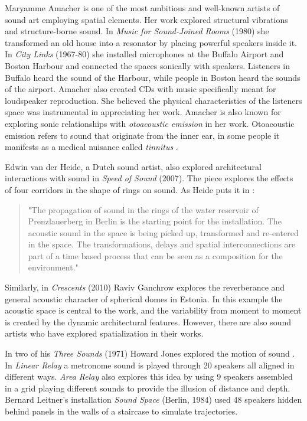 Maryamme Amacher is one of the most ambitious and well-known artists of sound art employing spatial elements. Her work explored structural vibrations and structure-borne sound. In \textit{Music for Sound-Joined Rooms} (1980) she transformed an old house into a resonator by placing powerful speakers inside it. In \textit{City Links} (1967-80) she installed microphones at the Buffalo Airport and Boston Harbour and connected the spaces sonically with speakers. Listeners in Buffalo heard the sound of the Harbour, while people in Boston heard the sounds of the airport. Amacher also created CDs with music specifically meant for loudspeaker reproduction. She believed the physical characteristics of the listeners space was instrumental in appreciating her work\cite{ouzounian2008sound}. Amacher is also known for exploring sonic relationships with \textit{otoacoustic emission} in her work. Otoacoustic emission refers to sound that originate from the inner ear, in some people it manifests as a medical nuisance called \textit{tinnitus} \cite{brummer2017composition}.  

Edwin van der Heide, a Dutch sound artist, also explored architectural interactions with sound in \textit{Speed of Sound} (2007). The piece explores the effects of four corridors in the shape of rings on sound. As Heide puts it in \cite{TheSpeed60online}:

\begin{quote}
    "The propagation of sound in the rings of the water reservoir of Prenzlauerberg in Berlin is the starting point for the installation. The acoustic sound in the space is being picked up, transformed and re-entered in the space. The transformations, delays and spatial interconnections are part of a time based process that can be seen as a composition for the environment."
\end{quote}

Similarly, in \textit{Crescents} (2010) Raviv Ganchrow explores the reverberance and general acoustic character of spherical domes in Estonia. In this example the acoustic space is central to the work, and the variability from moment to moment is created by the dynamic architectural features. However, there are also sound artists who have explored spatialization in their works. 

In two of his \textit{Three Sounds} (1971) Howard Jones explored the motion of sound \cite{macedo2015investigating}. In \textit{Linear Relay} a metronome sound is played through 20 speakers all aligned in different ways. \textit{Area Relay} also explores this idea by using 9 speakers assembled in a grid playing different sounds to provide the illusion of distance and depth. Bernard Leitner's installation \textit{Sound Space} (Berlin, 1984) used 48 speakers hidden behind panels in the walls of a staircase to simulate trajectories.  

